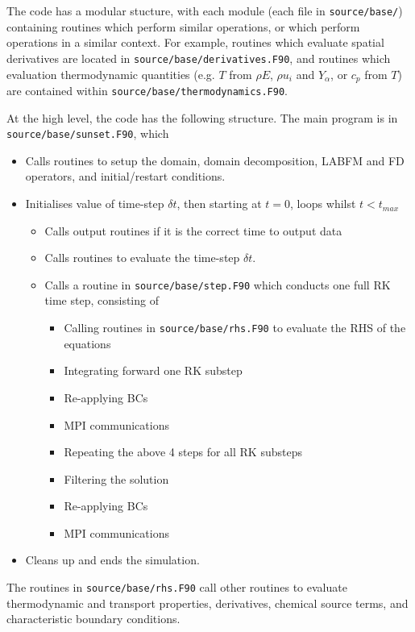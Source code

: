 \documentclass[notitlepage]{revtex4-1}
\begin{document}
The code has a modular stucture, with each module (each file in \verb|source/base/|) containing routines which perform similar operations, or which perform operations in a similar context. For example, routines which evaluate spatial derivatives are located in \verb|source/base/derivatives.F90|, and routines which evaluation thermodynamic quantities (e.g. $T$ from $\rho{E}$, $\rho{u}_{i}$ and $Y_{\alpha}$, or $c_{p}$ from $T$) are contained within \verb|source/base/thermodynamics.F90|.

At the high level, the code has the following structure. The main program is in \verb|source/base/sunset.F90|, which
\begin{itemize}
\item Calls routines to setup the domain, domain decomposition, LABFM and FD operators, and initial/restart conditions.
\item Initialises value of time-step $\delta{t}$, then starting at $t=0$, loops whilst $t<t_{max}$
\begin{itemize}
\item Calls output routines if it is the correct time to output data
\item Calls routines to evaluate the time-step $\delta{t}$.
\item Calls a routine in \verb|source/base/step.F90| which conducts one full RK time step, consisting of
\begin{itemize}
\item Calling routines in \verb|source/base/rhs.F90| to evaluate the RHS of the equations
\item Integrating forward one RK substep
\item Re-applying BCs
\item MPI communications
\item Repeating the above 4 steps for all RK substeps
\item Filtering the solution
\item Re-applying BCs
\item MPI communications
\end{itemize}
\end{itemize}
\item Cleans up and ends the simulation.
\end{itemize}

The routines in \verb|source/base/rhs.F90| call other routines to evaluate thermodynamic and transport properties, derivatives, chemical source terms, and characteristic boundary conditions.
\end{document}

